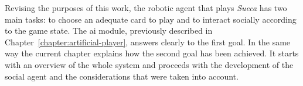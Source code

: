\label{chapter:sueca-player}

Revising the purposes of this work, the robotic agent that plays \emph{Sueca} has two main tasks: to choose an adequate card to play and to interact socially according to the game state.
The \ac{ai} module, previously described in Chapter~\ref{chapter:artificial-player}, answers clearly to the first goal.
In the same way the current chapter explains how the second goal has been achieved.
It starts with an overview of the whole system and proceeds
with the development of the social agent and the considerations that were taken into account.




\cleardoublepage

